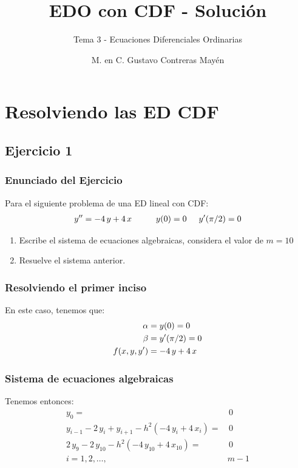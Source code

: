 \documentclass[12pt]{beamer}
\title{\large{EDO con CDF - Solución}}
\subtitle{Tema 3 - Ecuaciones Diferenciales Ordinarias}
\author{M. en C. Gustavo Contreras Mayén}
\date{}
\begin{document}
\maketitle

\section{Resolviendo las ED CDF}
\subsection{Ejercicio 1}

\begin{frame}
\frametitle{Enunciado del Ejercicio}
Para el siguiente problema de una ED lineal con CDF:
\pause
\begin{align*}
{y}^{\prime \prime} = - 4 \, y + 4 \, x \hspace{1cm} y (0) = 0 \hspace{0.5cm} {y}^{\prime} (\pi/2) = 0
\end{align*}
\pause
{}
\begin{enumerate}[<+->]
\item Escribe el sistema de ecuaciones algebraicas, considera el valor de $m = 10$
\item Resuelve el sistema anterior.
\end{enumerate}
\end{frame}
\begin{frame}
\frametitle{Resolviendo el primer inciso}
En este caso, tenemos que:
\pause
\begin{align*}
\alpha &= y (0) = 0 \\
\beta &= {y}^{\prime} (\pi/2) = 0 \\
f (x, y, {y}^{\prime}) &= - 4 \, y + 4 \, x
\end{align*}
\end{frame}
\begin{frame}
\frametitle{Sistema de ecuaciones algebraicas}
Tenemos entonces:
\pause
\begin{align*}
y_{0} =& \, 0 \\
y_{i-1} - 2 \, y_{i} + y_{i+1} - h^{2} (- 4 \, y_{i} + 4 \, x_{i}) =& \, 0 \\
2 \, y_{9} - 2 \, y_{10} - h^{2} (- 4 \, y_{10} + 4 \, x_{10}) =& \, 0 \\
i = 1, 2, \ldots, &m - 1
\end{align*}
\end{frame}
\end{document}

